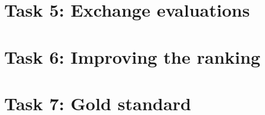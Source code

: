 \section{Task 5: Exchange evaluations}


\section{Task 6: Improving the ranking}


\section{Task 7: Gold standard}


